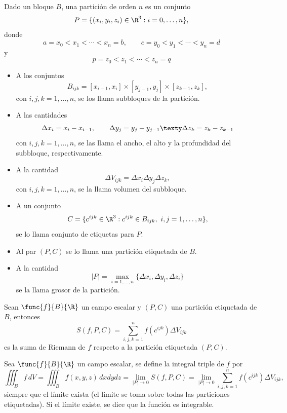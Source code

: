 \documentclass[a4,11pt]{aleph-notas}
\begin{document}
\begin{defi}
    Dado un bloque $B$, una partición de orden $n$ es un conjunto
    \[
        P=\{(x_i,y_i,z_i)\in\R^3:i=0,\ldots,n\},
    \]
    donde
    \[
        a=x_0<x_1<\cdots<x_n=b,
    \qquad
        c=y_0<y_1<\cdots<y_n=d
    \]
    y
    \[
        p=z_0<z_1<\cdots<z_n=q
    \]
    \begin{itemize}
    \item 
        A los conjuntos 
        \[
            B_{ijk}=[x_{i-1},x_i]\times[y_{j-1},y_j]\times[z_{k-1},z_k],
        \]
        con $i,j,k=1,\ldots,n$, se los llama subbloques de la partición.
    \item 
        A las cantidades
        \[
            \Delta x_i=x_i-x_{i-1},
        \qquad
            \Delta y_j=y_j-y_{j-1}
        \texty
            \Delta z_k=z_k-z_{k-1}
        \]
        con $i,j,k=1,\ldots,n$, se las llama el ancho, el alto y la profundidad del subbloque, respectivamente.
    \item
        A la cantidad
        \[
            \Delta V_{ijk} = \Delta x_i\Delta y_j\Delta z_k,
        \]
        con $i,j,k=1,\ldots,n$, se la llama volumen del subbloque.
    \item 
        A un conjunto
        \[
            C = \{c^{ijk}\in\R^3: c^{ijk}\in B_{ijk},\ i,j=1,\ldots,n\},
        \]
        se lo llama conjunto de etiquetas para $P$.
    \item 
        Al par $(P,C)$ se lo llama una partición etiquetada de $B$.
    \item
        A la cantidad
        \[
            |P| = \max_{i=1,\ldots,n}\{\Delta x_i,\Delta y_i,\Delta z_i\}
        \]
        se la llama grosor de la partición.
    \end{itemize}
\end{defi}

\begin{defi}
    Sean $\func{f}{B}{\R}$ un campo escalar y $(P,C)$ una partición etiquetada de $B$, entonces
    \[
        S(f,P,C) = \sum_{i,j,k=1}^n f(c^{ijk})\Delta V_{ijk}
    \]
    es la suma de Riemann de $f$ respecto a la partición etiquetada $(P,C)$.
\end{defi}

\begin{defi}
    Sea $\func{f}{B}{\R}$ un campo escalar, se define la integral triple de $f$ por
    \[
        \iiint_B f\, dV
        =\iiint_B f(x,y,z)\,dxdydz 
        = \lim_{|P|\to 0} S(f,P,C) 
        = \lim_{|P|\to 0} \sum_{i,j,k=1}^n f(c^{ijk})\Delta V_{ijk},
    \]
    siempre que el límite exista (el limite se toma sobre todas las particiones etiquetadas). Si el límite existe, se dice que la función es integrable.
\end{defi}
\end{document}
